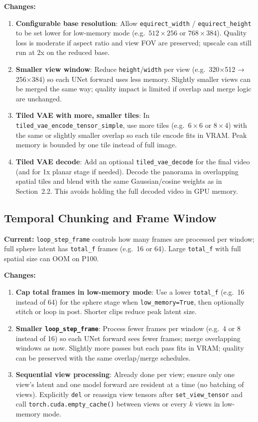 \documentclass[11pt,a4paper]{article}
\newcommand{\fn}[1]{\texttt{#1}}
\begin{document}
\textbf{Changes:}
\begin{enumerate}
    \item \textbf{Configurable base resolution}: Allow \fn{equirect\_width} / \fn{equirect\_height} to be set lower for low-memory mode (e.g.\ $512\times 256$ or $768\times 384$). Quality loss is moderate if aspect ratio and view FOV are preserved; upscale can still run at 2x on the reduced base.
    \item \textbf{Smaller view window}: Reduce \fn{height}/\fn{width} per view (e.g.\ 320$\times$512 → 256$\times$384) so each UNet forward uses less memory. Slightly smaller views can be merged the same way; quality impact is limited if overlap and merge logic are unchanged.
    \item \textbf{Tiled VAE with more, smaller tiles}: In \fn{tiled\_vae\_encode\_tensor\_simple}, use more tiles (e.g.\ $6\times 6$ or $8\times 4$) with the same or slightly smaller overlap so each tile encode fits in VRAM. Peak memory is bounded by one tile instead of full image.
    \item \textbf{Tiled VAE decode}: Add an optional \fn{tiled\_vae\_decode} for the final video (and for 1x planar stage if needed). Decode the panorama in overlapping spatial tiles and blend with the same Gaussian/cosine weights as in Section~2.2. This avoids holding the full decoded video in GPU memory.
\end{enumerate}

\subsection{Temporal Chunking and Frame Window}

\textbf{Current:} \fn{loop\_step\_frame} controls how many frames are processed per window; full sphere latent has \fn{total\_f} frames (e.g.\ 16 or 64). Large \fn{total\_f} with full spatial size can OOM on P100.

\textbf{Changes:}
\begin{enumerate}
    \item \textbf{Cap total frames in low-memory mode}: Use a lower \fn{total\_f} (e.g.\ 16 instead of 64) for the sphere stage when \fn{low\_memory=True}, then optionally stitch or loop in post. Shorter clips reduce peak latent size.
    \item \textbf{Smaller \fn{loop\_step\_frame}}: Process fewer frames per window (e.g.\ 4 or 8 instead of 16) so each UNet forward sees fewer frames; merge overlapping windows as now. Slightly more passes but each pass fits in VRAM; quality can be preserved with the same overlap/merge schedules.
    \item \textbf{Sequential view processing}: Already done per view; ensure only one view’s latent and one model forward are resident at a time (no batching of views). Explicitly \fn{del} or reassign view tensors after \fn{set\_view\_tensor} and call \fn{torch.cuda.empty\_cache()} between views or every $k$ views in low-memory mode.
\end{enumerate}
\end{document}
